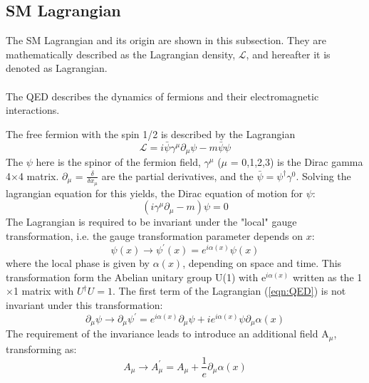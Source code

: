 \subsection{SM Lagrangian}
\label{subsec:Lagrangian}
The SM Lagrangian and its origin are shown in this subsection. 
They are mathematically described as the Lagrangian density, $\mathcal{L}$, and hereafter it is denoted as Lagrangian.\\

\noindent\textbf{} \\ 
The QED describes the dynamics of fermions and their electromagnetic interactions.

The free fermion with the spin 1/2 is described by the Lagrangian\\
\begin{equation}
\label{eqn:QED}
\mathcal{L}=i \bar{\psi} \gamma^{\mu} \partial_{\mu} \psi-m \bar{\psi} \psi
\end{equation}
The $\psi$ here is the spinor of the fermion field, $\gamma^{\mu}$  ($\mu$ = 0,1,2,3) is the Dirac gamma 4$\times$4 matrix. $\partial_{\mu}$ = $\frac{\delta}{\delta x_{\mu}}$ are the partial derivatives, and the $\bar{\psi}=\psi^{\dagger} \gamma^{0}$.
Solving the lagrangian equation for this yields, the Dirac equation of motion for $\psi$:
\begin{equation}
\left(i \gamma^{\mu} \partial_{\mu}-m\right) \psi=0
\end{equation}
The Lagrangian is required to be invariant under the "local" gauge transformation, i.e. the gauge transformation parameter depends on $x$:
\begin{equation}
\psi(x) \rightarrow \psi^{\prime}(x)=e^{i \alpha(x)} \psi(x)
\end{equation}
where the local phase is given by $\alpha(x)$, depending on space and time. 
This transformation form the Abelian unitary group U(1) with e$^{i\alpha(x)}$ written as the 1$\times$1 matrix with $U^{\dagger} U=1$.
The first term of the Lagrangian (\ref{eqn:QED}) is not invariant under this transformation:
\begin{equation}
\partial_{\mu} \psi \rightarrow \partial_{\mu} \psi^{\prime}=e^{i \alpha(x)} \partial_{\mu} \psi+i e^{i \alpha(x)} \psi \partial_{\mu} \alpha(x)
\end{equation}
The requirement of the invariance leads to introduce an additional field A$_\mu$, transforming as:
\begin{equation}
A_{\mu} \rightarrow A_{\mu}^{\prime}=A_{\mu}+\frac{1}{e} \partial_{\mu} \alpha(x)
\end{equation}
